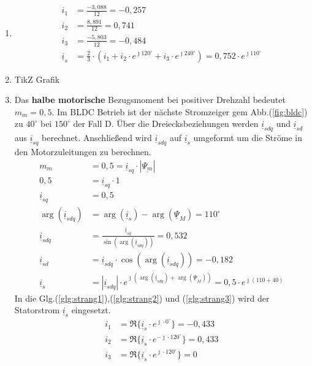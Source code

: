 \begin{solution}
\begin{enumerate}
\item
\begin{align}
i_1 &= \frac{-3,088}{12} = -0,257\\
i_2 &= \frac{8,891}{12} = 0,741\\
i_3 &= \frac{-5,803}{12} = -0,484\\
\underline{i}_s &= \frac{2}{3} \cdot ( i_1 + i_2 \cdot e^{\jmath 120 ^\circ} + i_3 \cdot e^{\jmath 240 ^\circ}) = 0,752 \cdot e^{\jmath 110^\circ}
\end{align}
\item TikZ Grafik
\item Das \textbf{halbe motorische} Bezugsmoment bei positiver Drehzahl bedeutet $m_m = 0,5$. Im BLDC Betrieb ist der n\"achste Stromzeiger gem Abb.(\ref{fig:bldc}) zu $40^\circ$ bei $150^\circ$ der Fall D. \"Uber die Dreiecksbeziehungen werden $\underline{i}_{sdq}$ und $\underline{i}_{sd}$ aus $\underline{i}_{sq}$ berechnet. Anschließend wird $\underline{i}_{sdq}$ auf $\underline{i}_{s}$ umgeformt um die Str\"ome in den Motorzuleitungen zu berechnen.
\begin{align}
m_m &= 0,5 = \underline{i}_{sq} \cdot |\underline{\Psi_m}|\\
0,5&= \underline{i}_{sq} \cdot 1\\
\underline{i}_{sq} &= 0,5\\
\arg(\underline{i}_{sdq}) &= \arg(\underline{i}_{s}) -\arg(\underline{\Psi}_{M})=110^\circ\\
\underline{i}_{sdq} &= \frac{\underline{i}_{sq}}{\sin(\arg(\underline{i}_{sdq}))}= 0,532\\
\underline{i}_{sd} &= \underline{i}_{sdq} \cdot \cos(\arg(\underline{i}_{sdq})) = -0,182\\
\underline{i}_{s} &= |\underline{i}_{sdq}| \cdot e^{\jmath (\arg(\underline{i}_{sdq}) + \arg(\underline{\Psi}_{M}))}= 0,5 \cdot e^{\jmath ( 110 + 40)}
\end{align}
In die Glg.(\ref{glg:strang1}),(\ref{glg:strang2}) und (\ref{glg:strang3}) wird der Statorstrom $\underline{i}_s$ eingesetzt.
\begin{align}
i_1 & = \Re \{ \underline{i}_s \cdot e^{\jmath \cdot 0 ^\circ} \} = -0,433\\
i_2 & = \Re \{ \underline{i}_s \cdot e^{-\jmath \cdot 120 ^\circ} \} = 0,433 \\
i_3 & = \Re \{ \underline{i}_s \cdot e^{\jmath \cdot 120 ^\circ} \}=  0
\end{align}

\end{enumerate}
\end{solution}

